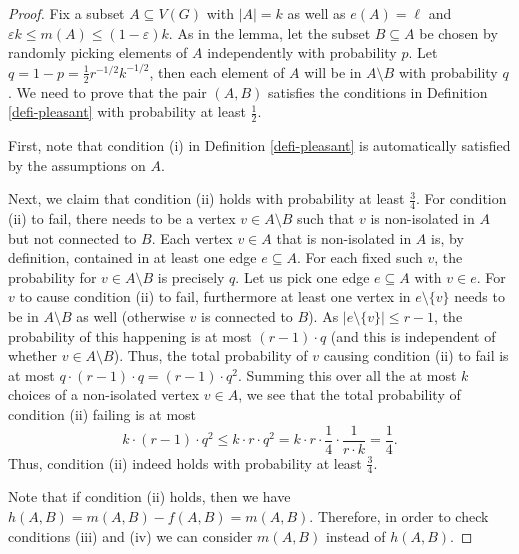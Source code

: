 \begin{proof}Fix a subset $A\subseteq V(G)$ with $\vert A\vert=k$ as well as $e(A)=\ell$ and $\varepsilon k \leq m(A)\leq (1-\varepsilon) k$. As in the lemma, let the subset $B\subseteq A$ be chosen by randomly picking elements of $A$ independently with probability $p$. Let $q=1-p=\frac{1}{2}r^{-1/2}k^{-1/2}$, then each element of $A$ will be in $A\setminus B$ with probability $q$. We need to prove that the pair $(A,B)$ satisfies the conditions in Definition \ref{defi-pleasant} with probability at least $\frac{1}{2}$.

First, note that condition (i) in Definition \ref{defi-pleasant} is automatically satisfied by the assumptions on $A$.

Next, we claim that condition (ii) holds with probability at least $\frac{3}{4}$. For condition (ii) to fail, there needs to be a vertex $v\in A\setminus B$ such that $v$ is non-isolated in $A$ but not connected to $B$. Each vertex $v\in A$ that is non-isolated in $A$ is, by definition, contained in at least one edge $e\subseteq A$. For each fixed such $v$, the probability for $v\in A\setminus B$ is precisely $q$. Let us pick one edge $e\subseteq A$ with $v\in e$. For $v$ to cause condition (ii) to fail, furthermore at least one vertex in $e\setminus \lbrace v\rbrace$ needs to be in $A\setminus B$ as well (otherwise $v$ is connected to $B$). As $\vert e\setminus \lbrace v\rbrace\vert\leq r-1$, the probability of this happening is at most $(r-1)\cdot q$ (and this is independent of whether $v\in A\setminus B$). Thus, the total probability of $v$ causing condition (ii) to fail is at most $q\cdot (r-1)\cdot q=(r-1)\cdot q^2$. Summing this over all the at most $k$ choices of a non-isolated vertex $v\in A$, we see that the total probability of condition (ii) failing is at most
\[k\cdot (r-1)\cdot q^2\leq k\cdot r\cdot q^2=k\cdot r\cdot \frac{1}{4}\cdot \frac{1}{r\cdot k}=\frac{1}{4}.\]
Thus, condition (ii) indeed holds with probability at least $\frac{3}{4}$.

Note that if condition (ii) holds, then we have $h(A,B)=m(A,B)-f(A,B)=m(A,B)$. Therefore, in order to check conditions (iii) and (iv) we can consider $m(A,B)$ instead of $h(A,B)$.


\end{proof}
